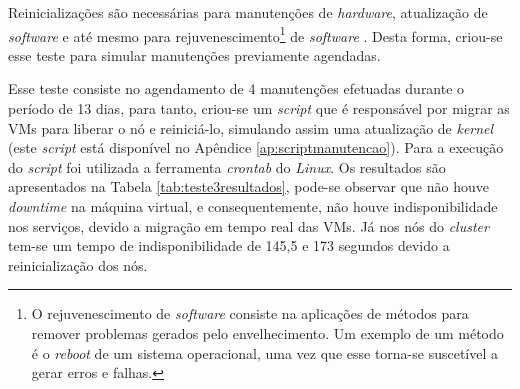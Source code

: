 Reinicializações são necessárias para manutenções de \textit{hardware}, atualização de \textit{software} e até mesmo para 
rejuvenescimento\footnote{O rejuvenescimento de \textit{software} consiste na aplicações de métodos para remover problemas gerados pelo 
envelhecimento. Um exemplo de um método é o \textit{reboot} de um sistema operacional, uma vez que esse torna-se suscetível a gerar erros e 
falhas.} de \textit{software} \cite{melo2014}. Desta forma, criou-se esse teste para simular manutenções previamente agendadas.


Esse teste consiste no agendamento de 4 manutenções efetuadas durante o período de 13 dias, para tanto, criou-se um \textit{script} que é 
responsável por migrar as \acp{VM} para liberar o nó e reiniciá-lo, simulando assim uma atualização de \textit{kernel} 
(este \textit{script} está disponível no Apêndice \ref{ap:scriptmanutencao}). 
Para a execução do \textit{script} foi utilizada a ferramenta \textit{crontab} do \textit{Linux}. 
Os resultados são apresentados na Tabela \ref{tab:teste3resultados}, pode-se observar que não houve \textit{downtime} na máquina virtual, e 
consequentemente, não houve indisponibilidade nos serviços, devido a migração em tempo real das \acp{VM}. 
Já nos nós do \textit{cluster} tem-se um tempo de indisponibilidade de 145,5 e 173 segundos devido a reinicialização dos nós.


